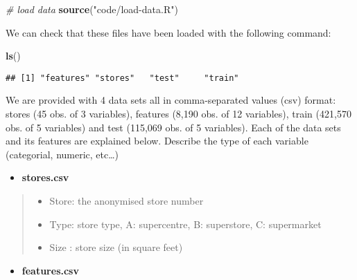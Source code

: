 \documentclass[11pt,]{article}
\newenvironment{Shaded}{\begin{snugshade}}{\end{snugshade}}
\newcommand{\KeywordTok}[1]{\textcolor[rgb]{0.13,0.29,0.53}{\textbf{{#1}}}}
\newcommand{\StringTok}[1]{\textcolor[rgb]{0.31,0.60,0.02}{{#1}}}
\newcommand{\CommentTok}[1]{\textcolor[rgb]{0.56,0.35,0.01}{\textit{{#1}}}}
\newcommand{\NormalTok}[1]{{#1}}
\providecommand{\tightlist}{%
  \setlength{\itemsep}{0pt}\setlength{\parskip}{0pt}}
\begin{document}
\begin{Shaded}
\begin{Highlighting}[]
\CommentTok{# load data}
\KeywordTok{source}\NormalTok{(}\StringTok{"code/load-data.R"}\NormalTok{)}
\end{Highlighting}
\end{Shaded}

We can check that these files have been loaded with the following
command:

\begin{Shaded}
\begin{Highlighting}[]
\KeywordTok{ls}\NormalTok{()}
\end{Highlighting}
\end{Shaded}

\begin{verbatim}
## [1] "features" "stores"   "test"     "train"
\end{verbatim}

We are provided with 4 data sets all in comma-separated values (csv)
format: stores (45 obs. of 3 variables), features (8,190 obs. of 12
variables), train (421,570 obs. of 5 variables) and test (115,069 obs.
of 5 variables). Each of the data sets and its features are explained
below. Describe the type of each variable (categorial, numeric,
etc\ldots{})

\begin{itemize}
\tightlist
\item
  \textbf{stores.csv}
\end{itemize}

\begin{quote}
\begin{itemize}
\tightlist
\item
  Store: the anonymised store number
\item
  Type: store type, A: supercentre, B: superstore, C: supermarket
\item
  Size : store size (in square feet)
\end{itemize}
\end{quote}

\begin{itemize}
\tightlist
\item
  \textbf{features.csv}
\end{itemize}
\end{document}
